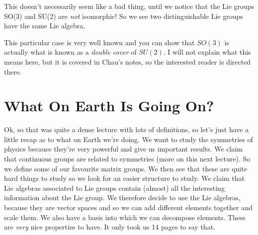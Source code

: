 This doesn't necessarily seem like a bad thing, until we notice that the Lie groups SO(3) and SU(2) are \textit{not} isomorphic! So we see two distinguishable Lie groups have the same Lie algebra. 

This particular case is very well known and you can show that $SO(3)$ is actually what is known as a \textit{double cover} of $SU(2)$. I will not explain what this means here, but it is covered in Chau's notes, so the interested reader is directed there. 

\section{What On Earth Is Going On?}

Ok, so that was quite a dense lecture with lots of definitions, so let's just have a little recap as to what on Earth we're doing. We want to study the symmetries of physics because they're very powerful and give us important results. We claim that continuous groups are related to symmetries (more on this next lecture). So we define some of our favourite matrix groups. We then see that these are quite hard things to study so we look for an easier structure to study. We claim that Lie algebras associated to Lie groups contain (almost) all the interesting information about the Lie group. We therefore decide to use the Lie algebras, because they are vector spaces and so we can add different elements together and scale them. We also have a basis into which we can decompose elements. These are \textit{very} nice properties to have. It only took us 14 pages to say that. 